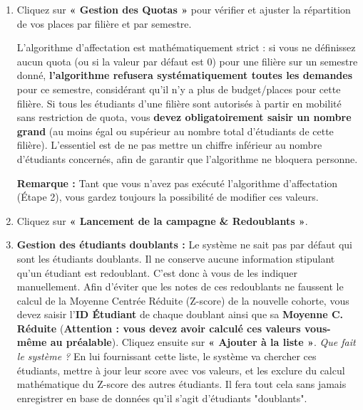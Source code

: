 \documentclass[12pt,a4paper]{article}
\begin{document}
\begin{enumerate}
    \item Cliquez sur \textbf{« Gestion des Quotas »} pour vérifier et ajuster la répartition de vos places par filière et par semestre.
    \begin{tcolorbox}[colback=yellow!10!white,colframe=orange!80!black,title=Règle sur les Quotas de Filière (Cas de mobilité illimitée)]
    L'algorithme d'affectation est mathématiquement strict : si vous ne définissez aucun quota (ou si la valeur par défaut est 0) pour une filière sur un semestre donné, \textbf{l'algorithme refusera systématiquement toutes les demandes} pour ce semestre, considérant qu'il n'y a plus de budget/places pour cette filière.
    \newline Si tous les étudiants d'une filière sont autorisés à partir en mobilité sans restriction de quota, vous \textbf{devez obligatoirement saisir un nombre grand} (au moins égal ou supérieur au nombre total d'étudiants de cette filière). L'essentiel est de ne pas mettre un chiffre inférieur au nombre d'étudiants concernés, afin de garantir que l'algorithme ne bloquera personne.
    \end{tcolorbox}
    \textbf{Remarque :} Tant que vous n'avez pas exécuté l'algorithme d'affectation (Étape 2), vous gardez toujours la possibilité de modifier ces valeurs.

    \item Cliquez sur \textbf{« Lancement de la campagne \& Redoublants »}.

    \item \textbf{Gestion des étudiants doublants :}
    \newline Le système ne sait pas par défaut qui sont les étudiants doublants. Il ne conserve aucune information stipulant qu'un étudiant est redoublant. C'est donc à vous de les indiquer manuellement.
    \newline Afin d'éviter que les notes de ces redoublants ne faussent le calcul de la Moyenne Centrée Réduite (Z-score) de la nouvelle cohorte, vous devez saisir l'\textbf{ID Étudiant} de chaque doublant ainsi que sa \textbf{Moyenne C. Réduite} (\textbf{Attention : vous devez avoir calculé ces valeurs vous-même au préalable}). Cliquez ensuite sur \textbf{« Ajouter à la liste »}.
    \newline \textit{Que fait le système ?} En lui fournissant cette liste, le système va chercher ces étudiants, mettre à jour leur score avec vos valeurs, et les exclure du calcul mathématique du Z-score des autres étudiants. Il fera tout cela sans jamais enregistrer en base de données qu'il s'agit d'étudiants "doublants".


\end{enumerate}
\end{document}
